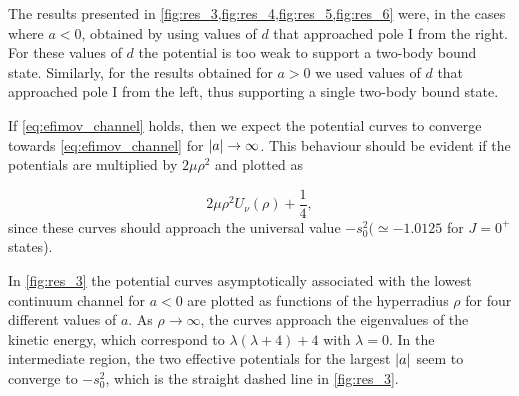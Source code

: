 The results presented in \cref{fig:res_3,fig:res_4,fig:res_5,fig:res_6} were, in the cases where $a<0$, obtained by using values of $d$ that approached pole $\mathrm{I}$ from the right. For these values of $d$ the potential is too weak to support a two-body bound state. Similarly, for the results obtained for $a>0$ we used values of $d$ that approached pole $\mathrm{I}$ from the left, thus supporting a single two-body bound state. 

If \eqref{eq:efimov_channel} holds, then we expect the potential curves to converge towards \eqref{eq:efimov_channel} for $\lvert a\rvert \rightarrow \infty$. This behaviour should be evident if the potentials are multiplied by $2 \mu \rho^2$ and plotted as 

\begin{equation}\label{eq:lambda}
2 \mu \rho^2 U_{\nu}(\rho) + \frac{1}{4},
\end{equation}
since these curves should approach the universal value $-s_0^2 (\simeq -1.0125$ for $J=0^+$ states).

In \cref{fig:res_3} the potential curves asymptotically associated with the lowest continuum channel for $a<0$ are plotted as functions of the hyperradius $\rho$ for four different values of $a$. As $\rho \rightarrow \infty$, the curves approach the eigenvalues of the kinetic energy, which correspond to $\lambda(\lambda + 4) + 4$ with $\lambda = 0$. In the intermediate region, the two effective potentials for the largest $\lvert a\rvert$ seem to converge to $-s_0^2$, which is the straight dashed line in \cref{fig:res_3}. 

